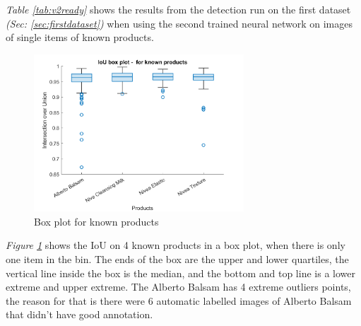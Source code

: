 \begin{table}[h]
\caption{Detection results when tested on trained data}
\label{tab:v2ready}
\end{table}
\textit{Table \ref{tab:v2ready}} shows the results from the detection run on the first dataset \textit{(Sec: \ref{sec:firstdataset})} when using the second trained neural network on images of single items of known products.

\begin{figure}[h]
    \centering
    \includegraphics[width=0.7\textwidth]{graphics/results/v2boxplotForKnownProducts.png}
    \caption{Box plot for known products}
    \label{fig:v2boxknownproducts}
\end{figure}
\textit{Figure \ref{fig:v2boxknownproducts}} shows the IoU on 4 known products in a box plot, when there is only one item in the bin. The ends of the box are the upper and lower quartiles,  the vertical line inside the box is the median, and the bottom and top line is a lower extreme and upper extreme. The Alberto Balsam has 4 extreme outliers points, the
reason for that is there were 6 automatic labelled images 
of Alberto Balsam that didn’t have good annotation. 

